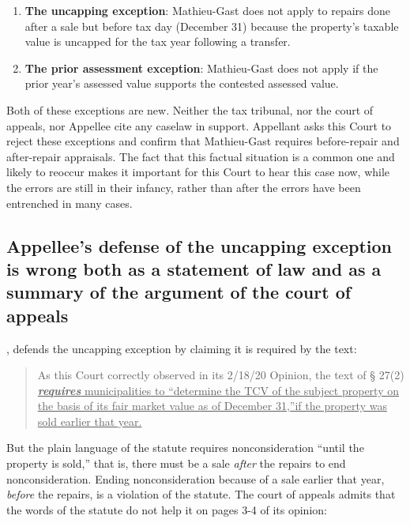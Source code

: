 \documentclass[12pt,\documentclassflag]{michiganCourtOfAppealsBrief}
\begin{document}
\begin{enumerate}
\item {\bfseries The uncapping exception}: Mathieu-Gast does not apply to repairs done after a sale but before tax day (December 31) because the property's taxable value is uncapped for the tax year following a transfer.
\item {\bfseries The prior assessment exception}: Mathieu-Gast does not apply if the prior year's assessed value supports the contested assessed value.
\end{enumerate}

Both of these exceptions are new. Neither the tax tribunal, nor the court of appeals, nor Appellee cite any caselaw in support. Appellant  asks this Court to reject these exceptions and confirm that Mathieu-Gast requires before-repair and after-repair appraisals.
The fact that this factual situation is a common one and likely to reoccur makes it important for this Court to hear this case now, while the errors are still in their infancy, rather than after the errors have been entrenched in many cases.

\subsection{Appellee's defense of the uncapping exception is wrong both as a statement of law and as a summary of the argument of the court of appeals}

, defends the uncapping exception by claiming it is required by the text:

\begin{quote}
  As this Court correctly observed in its 2/18/20 Opinion, the text of § 27(2)
\ul{\emph{\textbf{requires}} municipalities to ``determine the TCV of the subject property on the basis of its fair market
  value as of December 31,''if the property was sold earlier that year.}
\end{quote}

But the plain language of the statute requires nonconsideration ``until the property is sold,'' that is, there must be a sale \emph{after} the repairs to end nonconsideration. Ending nonconsideration because of a sale earlier that year, \emph{before} the repairs, is a violation of the statute.
The court of appeals admits that the words of the statute do not help it on pages 3-4 of its opinion:
\end{document}
